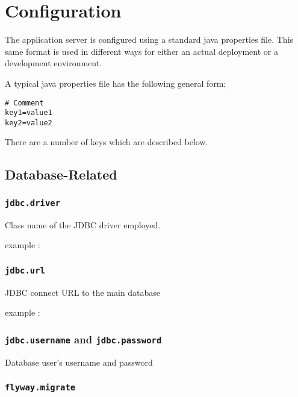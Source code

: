 
\section{Configuration}
\label{config}

The application server is configured using a standard java properties file.  This same format is used in different ways for either an actual deployment or a development environment.

A typical java properties file has the following general form;

\begin{verbatim}
# Comment
key1=value1
key2=value2
\end{verbatim}

There are a number of keys which are described below.

\subsection{Database-Related}

\subsubsection{\tt jdbc.driver}

Class name of the JDBC driver employed.

example : 

\subsubsection{\tt jdbc.url}

JDBC connect URL to the main database

example : 

\subsubsection{{\tt jdbc.username} and {\tt jdbc.password}}

Database user's username and password

\subsubsection{\tt flyway.migrate}

